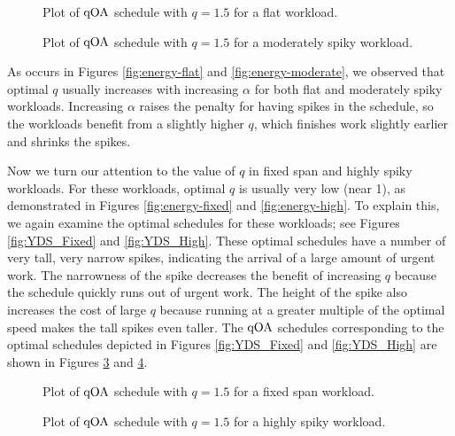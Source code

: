 \documentclass[11pt]{article}
\newcommand{\qOA}{{\rm qOA}}
\begin{document}
\begin{figure}
\centering
{}
\caption{Plot of $\qOA$ schedule with $q = 1.5$ for a flat workload.}
\label{fig:qOA_Flat}
\end{figure}

\begin{figure}
\centering
{}
\caption{Plot of $\qOA$ schedule with $q = 1.5$ for a moderately
  spiky workload.}
\label{fig:qOA_Moderate}
\end{figure}

As occurs in Figures \ref{fig:energy-flat} and
\ref{fig:energy-moderate}, we observed that optimal $q$ usually
increases with increasing $\alpha$ for both flat and
moderately spiky workloads.
Increasing $\alpha$ raises the penalty for having spikes in the
schedule, so the workloads benefit from a slightly higher $q$, which
finishes work slightly earlier and shrinks the spikes.

Now we turn our attention to the value of $q$ in fixed span and
highly spiky workloads.
For these workloads, optimal $q$
is usually very low (near 1), as demonstrated in Figures
\ref{fig:energy-fixed} and \ref{fig:energy-high}.
To explain this, we again examine the optimal schedules for these
workloads; see Figures \ref{fig:YDS_Fixed} and \ref{fig:YDS_High}.
These optimal schedules have a number of very tall, very narrow spikes,
indicating the arrival of a large amount of urgent work.
The narrowness of the spike decreases the benefit of
increasing $q$ because the schedule quickly runs out of urgent work.
The height of the spike also increases the cost of large $q$ because
running at a greater multiple of the optimal speed makes the tall
spikes even taller.
The $\qOA$ schedules corresponding to the optimal schedules depicted in
Figures \ref{fig:YDS_Fixed} and \ref{fig:YDS_High} are shown in 
Figures \ref{fig:qOA_Fixed} and \ref{fig:qOA_High}.

\begin{figure}
\centering
{}
\caption{Plot of $\qOA$ schedule with $q = 1.5$ for a fixed span
  workload.}
\label{fig:qOA_Fixed}
\end{figure}

\begin{figure}
\centering
{}
\caption{Plot of $\qOA$ schedule with $q = 1.5$ for a highly spiky
  workload.}
\label{fig:qOA_High}
\end{figure}
\end{document}
